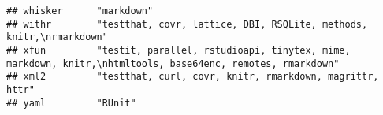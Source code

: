 \documentclass[]{article}
\begin{document}
\begin{verbatim}
## whisker      "markdown"                                                                                                                                                                                                                                                                                                                                                                                                                                                                                                                                                                                
## withr        "testthat, covr, lattice, DBI, RSQLite, methods, knitr,\nrmarkdown"                                                                                                                                                                                                                                                                                                                                                                                                                                                                                                                       
## xfun         "testit, parallel, rstudioapi, tinytex, mime, markdown, knitr,\nhtmltools, base64enc, remotes, rmarkdown"                                                                                                                                                                                                                                                                                                                                                                                                                                                                                 
## xml2         "testthat, curl, covr, knitr, rmarkdown, magrittr, httr"                                                                                                                                                                                                                                                                                                                                                                                                                                                                                                                                  
## yaml         "RUnit"                                                                                                                                                                                                                                                                                                                                                                                                                                                                                                                                                                                   

\end{verbatim}
\end{document}
